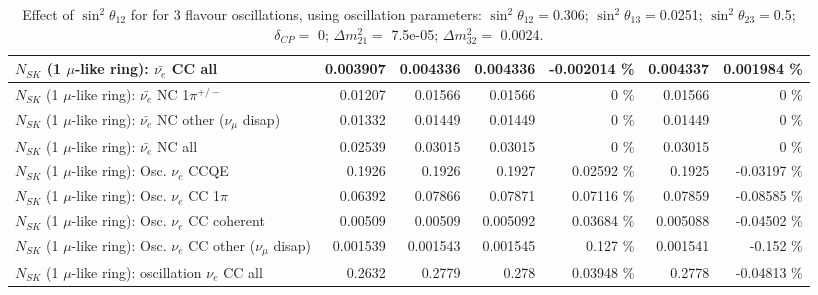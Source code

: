 \begin{table}
\begin{tabular}{| l | r | r | r  r | r  r |}
                            $N_{SK}$ (1 $\mu$-like ring): $\bar{\nu_{e}}$ CC all &        0.003907 &        0.004336 &        0.004336 & -0.002014 \%  &        0.004337 & 0.001984 \%  \\ 
\hline
                     $N_{SK}$ (1 $\mu$-like ring): $\bar{\nu_e}$ NC 1$\pi^{+/-}$ &         0.01207 &         0.01566 &         0.01566 &        0 \%  &         0.01566 &        0 \%  \\ 
          $N_{SK}$ (1 $\mu$-like ring): $\bar{\nu_e}$ NC other ($\nu_\mu$ disap) &         0.01332 &         0.01449 &         0.01449 &        0 \%  &         0.01449 &        0 \%  \\ 
                            $N_{SK}$ (1 $\mu$-like ring): $\bar{\nu_{e}}$ NC all &         0.02539 &         0.03015 &         0.03015 &        0 \%  &         0.03015 &        0 \%  \\ 
\hline
\hline
\hline
                                 $N_{SK}$ (1 $\mu$-like ring): Osc. $\nu_e$ CCQE &          0.1926 &          0.1926 &          0.1927 &  0.02592 \%  &          0.1925 & -0.03197 \%  \\ 
                            $N_{SK}$ (1 $\mu$-like ring): Osc. $\nu_e$ CC 1$\pi$ &         0.06392 &         0.07866 &         0.07871 &  0.07116 \%  &         0.07859 & -0.08585 \%  \\ 
                          $N_{SK}$ (1 $\mu$-like ring): Osc. $\nu_e$ CC coherent &         0.00509 &         0.00509 &        0.005092 &  0.03684 \%  &        0.005088 & -0.04502 \%  \\ 
           $N_{SK}$ (1 $\mu$-like ring): Osc. $\nu_e$ CC other ($\nu_\mu$ disap) &        0.001539 &        0.001543 &        0.001545 &    0.127 \%  &        0.001541 &   -0.152 \%  \\ 
                        $N_{SK}$ (1 $\mu$-like ring): oscillation $\nu_e$ CC all &          0.2632 &          0.2779 &           0.278 &  0.03948 \%  &          0.2778 & -0.04813 \%  \\ 
\hline
\hline
\end{tabular}
\caption{ Effect of $\sin^2\theta_{12}$ for for 3 flavour oscillations, using oscillation parameters:  $\sin^2\theta_{12} = $0.306; $\sin^2\theta_{13} = $0.0251; $\sin^2\theta_{23} = $0.5; $\delta_{CP} = $        0; $\Delta m^2_{21} = $    7.5e-05; $\Delta m^2_{32} = $    0.0024. }
\label{tab:num_mixing12_1RmuT_3f_osc_t13:0.0251}
\end{table}
\clearpage
